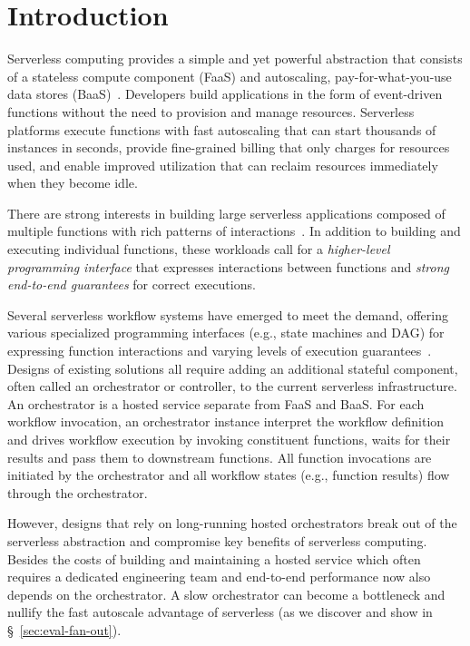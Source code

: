 \section{Introduction}

Serverless computing provides a simple and yet powerful abstraction that
consists of a stateless compute component (FaaS) and autoscaling,
pay-for-what-you-use data stores (BaaS)~\cite{berkeley}. Developers build
applications in the form of event-driven functions without the need to
provision and manage resources. Serverless platforms execute functions with
fast autoscaling that can start thousands of instances in seconds, provide
fine-grained billing that only charges for resources used, and enable improved
utilization that can reclaim resources immediately when they become idle.

There are strong interests in building large serverless applications composed
of multiple functions with rich patterns of interactions~\cite{excamera,
pywren, gg-atc, beldi, boki}. In addition to building and executing individual
functions, these workloads call for a \emph{higher-level programming
interface} that expresses interactions between functions and \emph{strong
end-to-end guarantees} for correct executions.

Several serverless workflow systems have emerged to meet the demand, offering
various specialized programming interfaces (e.g., state machines and DAG) for
expressing function interactions and varying levels of execution
guarantees~\cite{excamera, gg-atc, aws-step-functions, google-cloud-composer,
google-workflows, durable-functions}. Designs of existing solutions all
require adding an additional stateful component, often called an orchestrator
or controller, to the current serverless infrastructure. An orchestrator is a
hosted service separate from FaaS and BaaS. For each workflow invocation, an
orchestrator instance interpret the workflow definition and drives workflow
execution by invoking constituent functions, waits for their results and pass
them to downstream functions. All function invocations are initiated by the
orchestrator and all workflow states (e.g., function results) flow through the
orchestrator.

However, designs that rely on long-running hosted orchestrators break out of
the serverless abstraction and compromise key benefits of serverless
computing. Besides the costs of building and maintaining a hosted service
which often requires a dedicated engineering team and end-to-end performance
now also depends on the orchestrator. A slow orchestrator can become a
bottleneck and nullify the fast autoscale advantage of serverless (as we
discover and show in \S~\ref{sec:eval-fan-out}).

